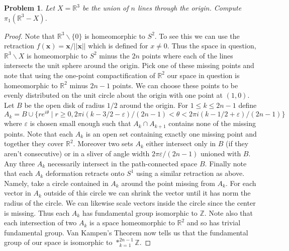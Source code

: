 \documentclass{article}
\newtheorem{problem}{Problem}
\begin{document}
\begin{problem}
Let $X = \mathbb{R}^3$ be the union of $n$ lines through the origin. Compute $\pi_1(\mathbb{R}^3 - X)$.
\end{problem}
\begin{proof}
Note that $\mathbb{R}^{3} \backslash \{0\}$ is homeomorphic to $S^2$. To see this we can use the retraction $f(\mathbf{x}) = \mathbf{x}/||\mathbf{x}||$ which is defined for $x \neq 0$. Thus the space in question, $\mathbb{R}^3 \backslash X$ is homeomorphic to $S^2$ minus the $2n$ points where each of the lines intersects the unit sphere around the origin.
\vspace{100pt}
Pick one of these missing points and note that using the one-point compactification of $\mathbb{R}^2$ our space in question is homeomorphic to $\mathbb{R}^2$ minus $2n-1$ points. We can choose these points to be evenly distributed on the unit circle about the origin with one point at $(1,0)$. Let $B$ be the open disk of radius $1/2$ around the origin. For $1 \leq k \leq 2n-1$ define $A_k = B \cup \{re^{i\theta} \mid r \geq 0, 2\pi i (k-3/2-\varepsilon)/(2n-1) < \theta < 2\pi i (k - 1/2 + \varepsilon)/(2n-1)\}$ where $\varepsilon$ is chosen small enough such that $A_k \cap A_{k+1}$ contains none of the missing points.
\vspace{100pt}
Note that each $A_k$ is an open set containing exactly one missing point and together they cover $\mathbb{R}^2$. Moreover two sets $A_k$ either intersect only in $B$ (if they aren't consecutive) or in a sliver of angle width $2\pi \varepsilon/(2n-1)$ unioned with $B$. Any three $A_k$ necessarily intersect in the path-connected space $B$.
\vspace{100pt}
Finally note that each $A_k$ deformation retracts onto $S^1$ using a similar retraction as above. Namely, take a circle contained in $A_k$ around the point missing from $A_k$. For each vector in $A_k$ outside of this circle we can shrink the vector until it has norm the radius of the circle. We can likewise scale vectors inside the circle since the center is missing. Thus each $A_k$ has fundamental group isomorphic to $\mathbb{Z}$. Note also that each intersection of two $A_k$ is a space homeomorphic to $\mathbb{R}^2$ and so has trivial fundamental group. Van Kampen's Theorem now tells us that the fundamental group of our space is isomorphic to $*_{k=1}^{2n-1} \mathbb{Z}$.
\end{proof}
\end{document}
